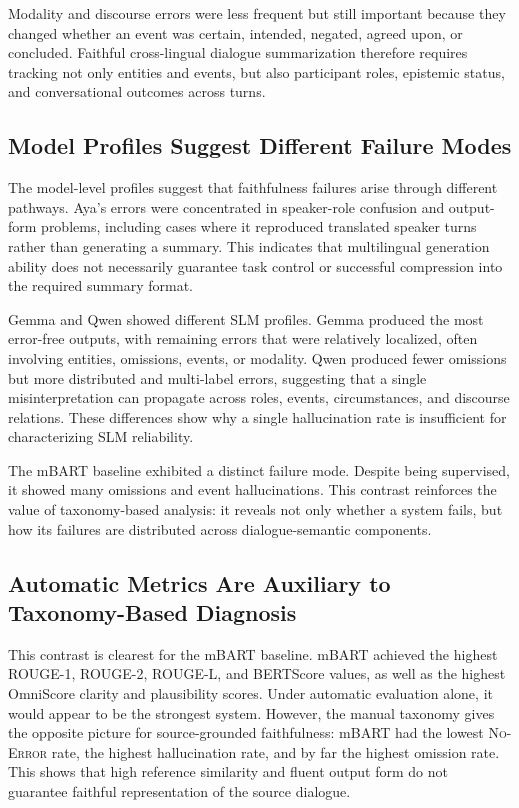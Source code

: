 \documentclass[11pt]{article}
\begin{document}
Modality and discourse errors were less frequent but still important because they changed whether an event was certain, intended, negated, agreed upon, or concluded. Faithful cross-lingual dialogue summarization therefore requires tracking not only entities and events, but also participant roles, epistemic status, and conversational outcomes across turns.


\subsection{Model Profiles Suggest Different Failure Modes}

The model-level profiles suggest that faithfulness failures arise through different pathways. Aya's errors were concentrated in speaker-role confusion and output-form problems, including cases where it reproduced translated speaker turns rather than generating a summary. This indicates that multilingual generation ability does not necessarily guarantee task control or successful compression into the required summary format.

Gemma and Qwen showed different SLM profiles. Gemma produced the most error-free outputs, with remaining errors that were relatively localized, often involving entities, omissions, events, or modality. Qwen produced fewer omissions but more distributed and multi-label errors, suggesting that a single misinterpretation can propagate across roles, events, circumstances, and discourse relations. These differences show why a single hallucination rate is insufficient for characterizing SLM reliability.

The mBART baseline exhibited a distinct failure mode. Despite being supervised, it showed many omissions and event hallucinations. This contrast reinforces the value of taxonomy-based analysis: it reveals not only whether a system fails, but how its failures are distributed across dialogue-semantic components.



\subsection{Automatic Metrics Are Auxiliary to Taxonomy-Based Diagnosis}

This contrast is clearest for the mBART baseline. mBART achieved the highest ROUGE-1, ROUGE-2, ROUGE-L, and BERTScore values, as well as the highest OmniScore clarity and plausibility scores. Under automatic evaluation alone, it would appear to be the strongest system. However, the manual taxonomy gives the opposite picture for source-grounded faithfulness: mBART had the lowest \textsc{No-Error} rate, the highest hallucination rate, and by far the highest omission rate. This shows that high reference similarity and fluent output form do not guarantee faithful representation of the source dialogue.
\end{document}
